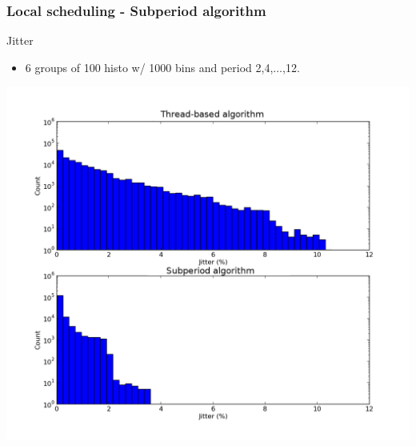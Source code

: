 \documentclass[]{prezentare}
\begin{document}
\begin{frame}
	\frametitle{Local scheduling - Subperiod algorithm}

	\begin{block}{Jitter}
	\begin{itemize}
	\item 6 groups of 100 histo w/ 1000 bins and period 2,4,$\ldots$,12.
	\end{itemize}
	\begin{center}
	\includegraphics[scale=.27]{../Images/jitter_histo}
	\end{center}
	\end{block}

\end{frame}
\end{document}

